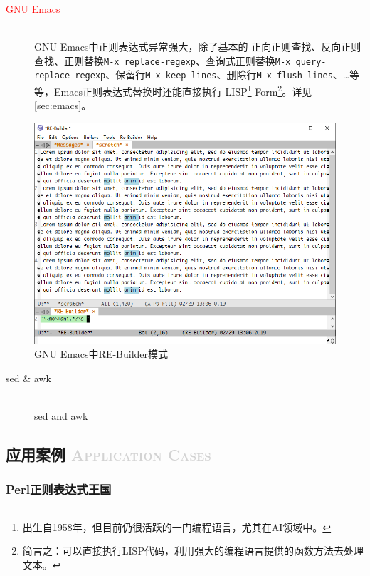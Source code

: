 \documentclass[12pt,a4paper,twoside]{ctexart}
\begin{document}
\clearpage{}
\begin{description}
\item[\textcolor{red}{GNU Emacs}] \hfill \\
  GNU Emacs中正则表达式异常强大，除了基本的 正向正则查找、反向正则查找、正则替换\texttt{M-x replace-regexp}、查询式正则替换\texttt{M-x query-replace-regexp}、保留行\texttt{M-x keep-lines}、删除行\texttt{M-x flush-lines}、\ldots 等等，Emacs正则表达式替换时还能直接执行 LISP\footnote{出生自1958年，但目前仍很活跃的一门编程语言，尤其在AI领域中。} Form\footnote{简言之：可以直接执行LISP代码，利用强大的编程语言提供的函数方法去处理文本。}。详见\ref{sec:emacs}。
\end{description}
\begin{figure}[htbp]
  \centering
  \includegraphics[width=15cm]{FIG/emacs-re-builder.png}
  \caption{GNU Emacs中RE-Builder模式}
  \label{fig:emacs-re-builder}
\end{figure}

\begin{description}
\item[sed \& awk] \hfill \\
  sed and awk
\end{description}

\clearpage{}

\subsection[应用案例]{应用案例 \textcolor{lightgray}{\textsc{Application Cases}}}
\label{sec:cases}

\subsubsection{Perl正则表达式王国}
\label{sec:perl}
\end{document}
